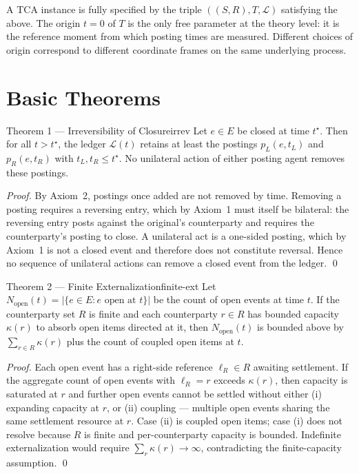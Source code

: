 \documentclass[11pt]{article}
\begin{document}
\bigskip

\noindent A TCA instance is fully specified by the triple $((S, R), T, \mathcal{L})$ satisfying the above. The origin $t = 0$ of $T$ is the only free parameter at the theory level: it is the reference moment from which posting times are measured. Different choices of origin correspond to different coordinate frames on the same underlying process.

\section{Basic Theorems}

\begin{theoremBOX}{Theorem 1 --- Irreversibility of Closure}{irrev}
Let $e \in E$ be closed at time $t^\star$. Then for all $t > t^\star$, the ledger $\mathcal{L}(t)$ retains at least the postings $p_L(e, t_L)$ and $p_R(e, t_R)$ with $t_L, t_R \leq t^\star$. No unilateral action of either posting agent removes these postings.
\end{theoremBOX}

\begin{proof}
By Axiom~2, postings once added are not removed by time. Removing a posting requires a reversing entry, which by Axiom~1 must itself be bilateral: the reversing entry posts against the original's counterparty and requires the counterparty's posting to close. A unilateral act is a one-sided posting, which by Axiom~1 is not a closed event and therefore does not constitute reversal. Hence no sequence of unilateral actions can remove a closed event from the ledger. \qed
\end{proof}

\begin{theoremBOX}{Theorem 2 --- Finite Externalization}{finite-ext}
Let $N_{\text{open}}(t) = |\{e \in E : e \text{ open at } t\}|$ be the count of open events at time $t$. If the counterparty set $R$ is finite and each counterparty $r \in R$ has bounded capacity $\kappa(r)$ to absorb open items directed at it, then $N_{\text{open}}(t)$ is bounded above by $\sum_{r \in R} \kappa(r)$ plus the count of coupled open items at $t$.
\end{theoremBOX}

\begin{proof}
Each open event has a right-side reference $\ell_R \in R$ awaiting settlement. If the aggregate count of open events with $\ell_R = r$ exceeds $\kappa(r)$, then capacity is saturated at $r$ and further open events cannot be settled without either (i) expanding capacity at $r$, or (ii) coupling — multiple open events sharing the same settlement resource at $r$. Case (ii) is coupled open items; case (i) does not resolve because $R$ is finite and per-counterparty capacity is bounded. Indefinite externalization would require $\sum_r \kappa(r) \to \infty$, contradicting the finite-capacity assumption. \qed
\end{proof}
\end{document}

